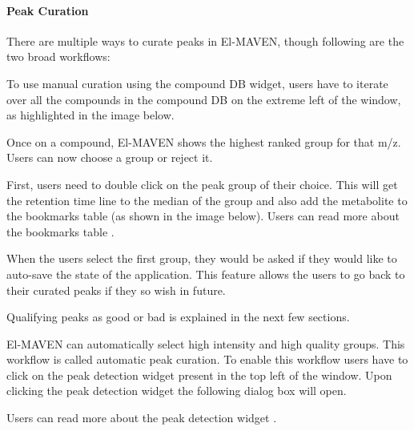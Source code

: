 \documentclass[letterpaper,10pt,english,openany,oneside]{sphinxmanual}
\begin{document}


\paragraph{Peak Curation}
\label{\detokenize{UnlabeledLCMSWorkflow:peak-curation}}
There are multiple ways to curate peaks in El-MAVEN, though following are the two broad workflows:


To use manual curation using the compound DB widget, users have to iterate over all the compounds in the compound DB on the extreme left of the window, as highlighted in the image below.


Once on a compound, El-MAVEN shows the highest ranked group for that m/z. Users can now choose a group or reject it.

First, users need to double click on the peak group of their choice. This will get the retention time line to the median of the group and also add the metabolite to the bookmarks table (as shown in the image below). Users can read more about the bookmarks table .


When the users select the first group, they would be asked if they would like to auto-save the state of the application. This feature allows the users to go back to their curated peaks if they so wish in future.


Qualifying peaks as good or bad is explained in the next few sections.


El-MAVEN can automatically select high intensity and high quality groups. This workflow is called automatic peak curation. To enable this workflow users have to click on the peak detection widget present in the top left of the window. Upon clicking the peak detection widget  the following dialog box will open.


Users can read more about the peak detection widget .
\end{document}
